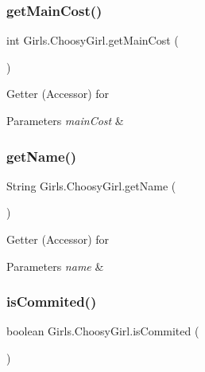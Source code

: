 \subsubsection{\texorpdfstring{get\+Main\+Cost()}{getMainCost()}}
{\footnotesize\ttfamily int Girls.\+Choosy\+Girl.\+get\+Main\+Cost (\begin{DoxyParamCaption}{ }\end{DoxyParamCaption})\hspace{0.3cm}{\ttfamily [inline]}}

Getter (Accessor) for 
\begin{DoxyParams}{Parameters}
{\em main\+Cost} & \\
\hline
\end{DoxyParams}
\mbox{\label{class_girls_1_1_choosy_girl_a77ed5e6bf6c765c59a837e941f9bf4c0}} 
\subsubsection{\texorpdfstring{get\+Name()}{getName()}}
{\footnotesize\ttfamily String Girls.\+Choosy\+Girl.\+get\+Name (\begin{DoxyParamCaption}{ }\end{DoxyParamCaption})\hspace{0.3cm}{\ttfamily [inline]}}

Getter (Accessor) for 
\begin{DoxyParams}{Parameters}
{\em name} & \\
\hline
\end{DoxyParams}
\mbox{\label{class_girls_1_1_choosy_girl_a670a58571cbfc327878255075654d8f9}} 
\subsubsection{\texorpdfstring{is\+Commited()}{isCommited()}}
{\footnotesize\ttfamily boolean Girls.\+Choosy\+Girl.\+is\+Commited (\begin{DoxyParamCaption}{ }\end{DoxyParamCaption})\hspace{0.3cm}{\ttfamily [inline]}}

